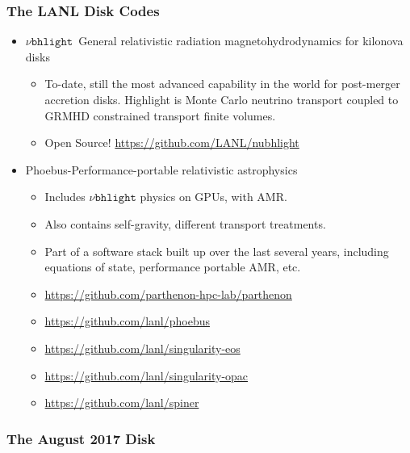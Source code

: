 \documentclass[]{beamer}
\begin{document}
\begin{frame}
  \frametitle{The LANL Disk Codes}
  \begin{itemize}
  \item $\nu\texttt{bhlight}$~General relativistic radiation magnetohydrodynamics for
    kilonova disks
    \begin{itemize}
    \item To-date, still the most advanced capability in the world for
      post-merger accretion disks. Highlight is Monte Carlo neutrino
      transport coupled to GRMHD constrained transport finite volumes.
    \item Open Source! {\color{blue}\url{https://github.com/LANL/nubhlight}}
    \end{itemize}
  \item Phoebus-Performance-portable relativistic astrophysics
    \begin{itemize}
    \item Includes $\nu\texttt{bhlight}$ physics on GPUs, with AMR.
    \item Also contains self-gravity, different transport treatments.
    \item Part of a software stack built up over the last several
      years, including equations of state, performance portable AMR,
      etc.
    \item {\color{blue}\url{https://github.com/parthenon-hpc-lab/parthenon}}
    \item {\color{blue}\url{https://github.com/lanl/phoebus}}
    \item {\color{blue}\url{https://github.com/lanl/singularity-eos}}
    \item {\color{blue}\url{https://github.com/lanl/singularity-opac}}
    \item {\color{blue}\url{https://github.com/lanl/spiner}}
    \end{itemize}
  \end{itemize}
\end{frame}

\begin{frame}
  \frametitle{The August 2017 Disk}
  \begin{center}
     \\
  \end{center}
\end{frame}
\end{document}
